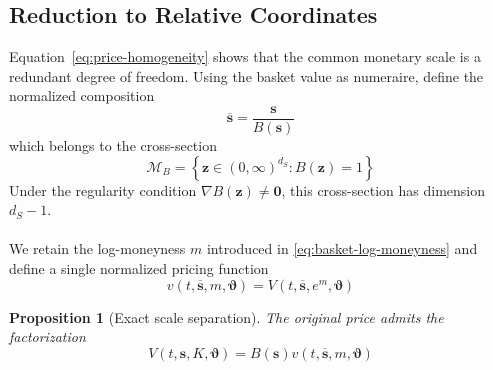 \documentclass{article}
\numberwithin{equation}{subsection}
\newtheorem{proposition}[theorem]{Proposition}
\theoremstyle{definition}
\theoremstyle{remark}
\begin{document}
\subsection{Reduction to Relative Coordinates}
\label{subsec:relative-coordinates}
Equation~\eqref{eq:price-homogeneity} shows that the common monetary scale is a
redundant degree of freedom. Using the basket value as numeraire, define the
normalized composition
\begin{equation}
\overline{\boldsymbol{s}}
=
\frac{\boldsymbol{s}}{B(\boldsymbol{s})}
\label{eq:normalized-composition}
\end{equation}
which belongs to the cross-section
\begin{equation}
\mathcal{M}_B
=
\left\{
\boldsymbol{z}\in(0,\infty)^{d_S}
:
B(\boldsymbol{z})=1
\right\}
\label{eq:basket-cross-section}
\end{equation}
Under the regularity condition
\(\nabla B(\boldsymbol{z})\neq\boldsymbol{0}\),
this cross-section has dimension \(d_S-1\).\\
\\
We retain the log-moneyness \(m\) introduced in
\eqref{eq:basket-log-moneyness} and define a single normalized pricing
function
\begin{equation}
v
\left(
t,\overline{\boldsymbol{s}},m,\boldsymbol{\vartheta}
\right)
=
V
\left(
t,\overline{\boldsymbol{s}},e^m,\boldsymbol{\vartheta}
\right)
\label{eq:normalized-pricing-function}
\end{equation}

\begin{proposition}[Exact scale separation]
The original price admits the factorization
\begin{equation}
V
\left(
t,\boldsymbol{s},K,\boldsymbol{\vartheta}
\right)
=
B(\boldsymbol{s})
v
\left(
t,\overline{\boldsymbol{s}},m,\boldsymbol{\vartheta}
\right)
\label{eq:exact-scale-separation}
\end{equation}
\end{proposition}
\end{document}
